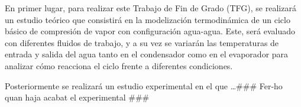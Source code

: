 \documentclass[../main.tex]{subfiles}
\begin{document}
En primer lugar, para realizar este Trabajo de Fin de Grado 
(TFG), se realizará un estudio teórico que consistirá en la 
modelización termodinámica de un ciclo básico de compresión de 
vapor con configuración agua-agua. Este, será evaluado con 
diferentes fluidos de trabajo, y a su vez se variarán las temperaturas 
de entrada y salida del agua tanto en el condensador como en el 
evaporador para analizar cómo reacciona el ciclo frente 
a diferentes condiciones.

Posteriormente se realizará un estudio experimental en el que 
\dots \#\#\# Fer-ho quan haja acabat el experimental \#\#\#

\newpage
\end{document}
